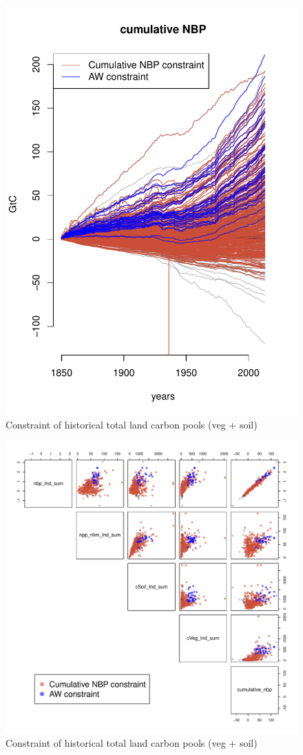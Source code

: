 \documentclass[gmd, manuscript]{copernicus}
\begin{document}
\begin{figure}[t]
\includegraphics[width=12cm]{./graphics/cumulative_nbp_constrained.pdf}
\caption{Constraint of historical total land carbon pools (veg + soil)}
\label{fig:total-land-carbon-sink-1}
\end{figure}

\begin{figure}[t]
\includegraphics[width=12cm]{./graphics/cumulative_nbp_constrained_pairs.pdf}
\caption{Constraint of historical total land carbon pools (veg + soil)}
\label{fig:total-land-carbon-sink-1}
\end{figure}
\end{document}
